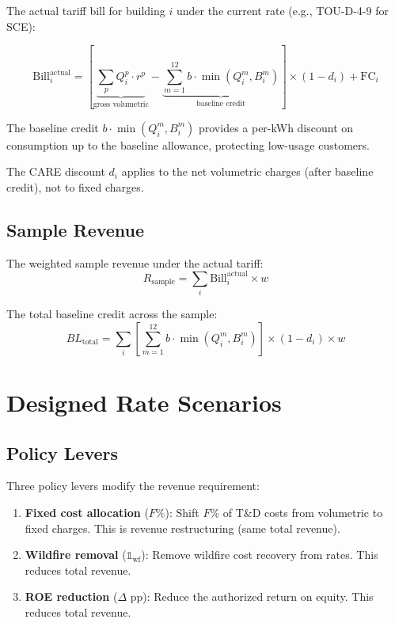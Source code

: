 \documentclass[11pt]{article}
\newcommand{\Rsample}{R_{\text{sample}}}
\newcommand{\BLtotal}{BL_{\text{total}}}
\begin{document}
The actual tariff bill for building $i$ under the current rate (e.g., TOU-D-4-9 for SCE):

\begin{equation}
\text{Bill}_i^{\text{actual}} = \left[ \underbrace{\sum_p Q_i^p \cdot r^p}_{\text{gross volumetric}} - \underbrace{\sum_{m=1}^{12} b \cdot \min(Q_i^m, B_i^m)}_{\text{baseline credit}} \right] \times (1 - d_i) + \text{FC}_i
\label{eq:actual_bill}
\end{equation}

The baseline credit $b \cdot \min(Q_i^m, B_i^m)$ provides a per-kWh discount on consumption up to the baseline allowance, protecting low-usage customers.

The CARE discount $d_i$ applies to the net volumetric charges (after baseline credit), not to fixed charges.

\subsection{Sample Revenue}

The weighted sample revenue under the actual tariff:
\begin{equation}
\Rsample = \sum_i \text{Bill}_i^{\text{actual}} \times w
\label{eq:r_sample}
\end{equation}

The total baseline credit across the sample:
\begin{equation}
\BLtotal = \sum_i \left[ \sum_{m=1}^{12} b \cdot \min(Q_i^m, B_i^m) \right] \times (1 - d_i) \times w
\label{eq:bl_total}
\end{equation}

\section{Designed Rate Scenarios}

\subsection{Policy Levers}

Three policy levers modify the revenue requirement:

\begin{enumerate}
    \item \textbf{Fixed cost allocation} ($F\%$): Shift $F\%$ of T\&D costs from volumetric to fixed charges. This is revenue restructuring (same total revenue).
    \item \textbf{Wildfire removal} ($\mathbb{1}_{\text{wf}}$): Remove wildfire cost recovery from rates. This reduces total revenue.
    \item \textbf{ROE reduction} ($\Delta$ pp): Reduce the authorized return on equity. This reduces total revenue.
\end{enumerate}
\end{document}

